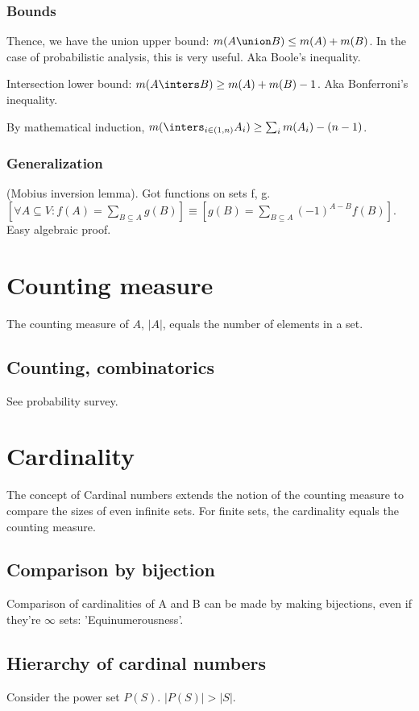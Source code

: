 \documentclass[oneside, article]{memoir}
\begin{document}
\subsubsection{Bounds}
Thence, we have the union upper bound: $m(A \union B) \leq m(A) + m(B)$. In the case of probabilistic analysis, this is very useful. Aka Boole's inequality.

Intersection lower bound: $m(A \inters B) \geq m(A) + m(B) - 1$. Aka Bonferroni's inequality. 

By mathematical induction, $m(\inters_{i \in (1, n)} A_i) \geq \sum_i m(A_i) - (n-1)$.

\subsubsection{Generalization}
(Mobius inversion lemma). Got functions on sets f, g. $[\forall A \subseteq V: f(A) = \sum_{B \subseteq A} g(B)] \equiv [g(B) = \sum_{B \subseteq A}(-1)^{A-B}f(B)]$. \chk Easy algebraic proof.

\section{Counting measure}
The counting measure of $A$, $|A|$, equals the number of elements in a set. 

\subsection{Counting, combinatorics}
See probability survey.

\section{Cardinality}
The concept of Cardinal numbers extends the notion of the counting measure to compare the sizes of even infinite sets. For finite sets, the cardinality equals the counting measure.

\subsection{Comparison by bijection}
Comparison of cardinalities of A and B can be made by making bijections, even if they're $\infty$ sets: 'Equinumerousness'.

\subsection{Hierarchy of cardinal numbers}
Consider the power set $P(S)$. $|P(S)|>|S|$.
\end{document}
